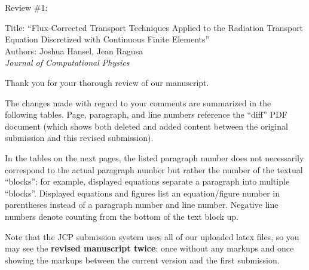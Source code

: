 
\pagestyle{empty}



Review \#1:

Title: ``Flux-Corrected Transport Techniques Applied to the Radiation Transport Equation Discretized with Continuous Finite Elements''\\
Authors: Joshua Hansel, Jean Ragusa \\
{\it Journal of Computational Physics}\\
\vspace{3cm}

Thank you for your thorough review of our manuscript.

The changes made with regard to your comments are summarized in the following
tables. Page, paragraph, and line numbers reference
the ``diff'' PDF document (which shows both deleted and added content between the original submission and this revised submission). 

In the tables on the next pages, the listed paragraph number does not necessarily correspond to the actual paragraph number
but rather the number of the textual ``blocks''; for example, displayed equations
separate a paragraph into multiple ``blocks''. Displayed equations and figures
list an equation/figure number in parentheses instead of a paragraph number
and line number. Negative line numbers denote counting from the bottom of the
text block up.

Note that the JCP submission system uses all of our uploaded latex files, so you may see the {\bf revised manuscript twice}: once without any markups and once showing the markups between the current version and the first submission.



